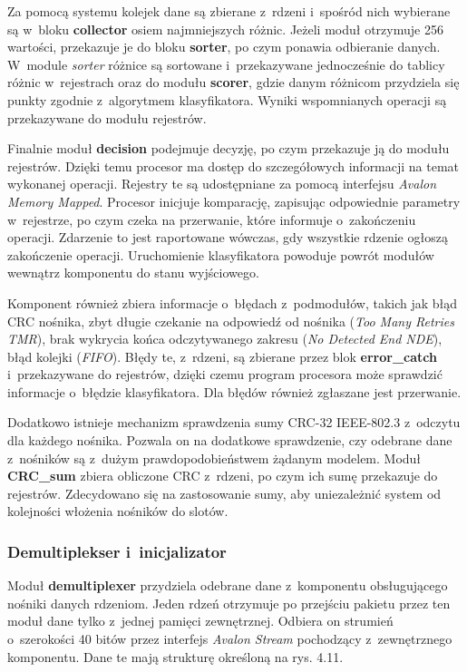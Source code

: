 Za pomocą systemu kolejek dane są zbierane z~rdzeni i~spośród nich wybierane są w~bloku \textbf{collector} osiem najmniejszych różnic. Jeżeli moduł otrzymuje 256 wartości, przekazuje je do bloku \textbf{sorter}, po czym ponawia odbieranie danych. W~module \textit{sorter} różnice są sortowane i~przekazywane jednocześnie do tablicy różnic w~rejestrach oraz do modułu \textbf{scorer}, gdzie danym różnicom przydziela się punkty zgodnie z~algorytmem klasyfikatora. Wyniki wspomnianych operacji są przekazywane do modułu rejestrów.

Finalnie moduł \textbf{decision} podejmuje decyzję, po czym przekazuje ją do modułu rejestrów. Dzięki temu procesor ma dostęp do szczegółowych informacji na temat wykonanej operacji. Rejestry te są udostępniane za pomocą interfejsu \textit{Avalon Memory Mapped}. Procesor inicjuje komparację, zapisując odpowiednie parametry w~rejestrze, po czym czeka na przerwanie, które informuje o~zakończeniu operacji. Zdarzenie to jest raportowane wówczas, gdy wszystkie rdzenie ogłoszą zakończenie operacji. Uruchomienie klasyfikatora powoduje powrót modułów wewnątrz komponentu do stanu wyjściowego.

Komponent również zbiera informacje o~błędach z~podmodułów, takich jak błąd CRC nośnika, zbyt długie czekanie na odpowiedź od nośnika (\textit{Too Many Retries TMR}), brak wykrycia końca odczytywanego zakresu (\textit{No Detected End NDE}), błąd kolejki (\textit{FIFO}). Błędy te, z~rdzeni, są zbierane przez blok \textbf{error\_catch} i~przekazywane do rejestrów, dzięki czemu program procesora może sprawdzić informacje o~błędzie klasyfikatora. Dla błędów również zgłaszane jest przerwanie.

Dodatkowo istnieje mechanizm sprawdzenia sumy CRC-32 IEEE-802.3 \cite{CRC32} z~odczytu dla każdego nośnika. Pozwala on na dodatkowe sprawdzenie, czy odebrane dane z~nośników są z~dużym prawdopodobieństwem żądanym modelem. Moduł \textbf{CRC\_sum} zbiera obliczone CRC z~rdzeni, po czym ich sumę przekazuje do rejestrów. Zdecydowano się na zastosowanie sumy, aby uniezależnić system od kolejności włożenia nośników do slotów.




\subsubsection{Demultiplekser  i~inicjalizator}

Moduł \textbf{demultiplexer} przydziela odebrane dane z~komponentu obsługującego nośniki danych rdzeniom. Jeden rdzeń otrzymuje po przejściu pakietu przez ten moduł dane tylko z~jednej pamięci zewnętrznej. Odbiera on strumień o~szerokości 40 bitów przez interfejs \textit{Avalon Stream} pochodzący z~zewnętrznego komponentu. Dane te mają strukturę określoną na rys. 4.11.

